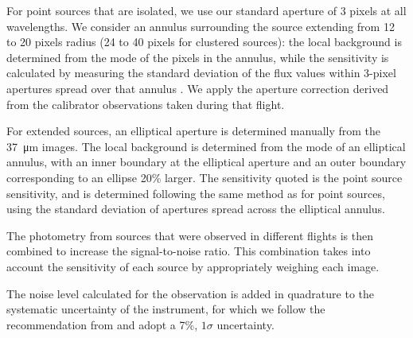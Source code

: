For point sources that are isolated, we use our standard aperture of 3 pixels at all wavelengths. We consider an annulus surrounding the source extending from 12 to 20 pixels radius (24 to 40 pixels for clustered sources): the local background is determined from the mode of the pixels in the annulus, while the sensitivity is calculated by measuring the standard deviation of the flux values within 3-pixel apertures spread over that annulus \citep{Shimizu:2016if}. We apply the aperture correction derived from the calibrator observations taken during that flight.

For extended sources, an elliptical aperture is determined manually from the \SI{37}{\micro\meter} images. The local background is determined from the mode of an elliptical annulus, with an inner boundary at the elliptical aperture and an outer boundary corresponding to an ellipse 20\% larger. The sensitivity quoted is the point source sensitivity, and is determined following the same method as for point sources, using the standard deviation of apertures spread across the elliptical annulus. 

The photometry from sources that were observed in different flights is then combined to increase the signal-to-noise ratio. This combination takes into account the sensitivity of each source by appropriately weighing each image.

The noise level calculated for the observation is added in quadrature to the systematic uncertainty of the instrument, for which we follow the recommendation from \citep{Herter:2012hv} and adopt a 7\%, $1\sigma$ uncertainty. 

